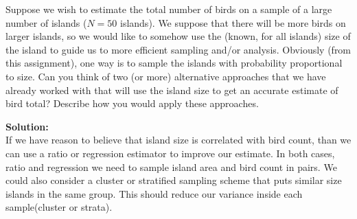 \documentclass[12pt]{article}
\makeatletter
\theoremstyle{homework}
\newenvironment{exercise}[1]
{\def\@currentlabel{#1}\exercisecore}
{\endexercisecore}
\newcommand{\localhead}[1]{\par\smallskip\noindent\textbf{#1}\nobreak\\}%
\newcommand\solution{\localhead{Solution:}}
\makeatother
\begin{document}
\vspace{1in}


\begin{exercise}{3} 
  Suppose we wish to estimate the total number of birds on a sample of a large number of islands ($N = 50$ islands). 
  We suppose that there will be more birds on larger islands, so we would like to somehow use the (known, for all islands) 
  size of the island to guide us to more efficient sampling and/or analysis. Obviously (from this assignment), one way is to 
  sample the islands with probability proportional to size. Can you think of two (or more) alternative approaches that we have 
  already worked with that will use the island size to get an accurate estimate of bird total? Describe how you would apply 
  these approaches.\\
  \solution If we have reason to believe that island size is correlated with bird count, than we can use a ratio or regression estimator to 
  improve our estimate. In both cases, ratio and regression we need to sample island area and bird count in pairs. We could also consider a cluster or 
  stratified sampling scheme that puts similar size islands in the same group. This should reduce our variance inside each sample(cluster or strata). 
\end{exercise}

\vspace{1in}
\end{document}
